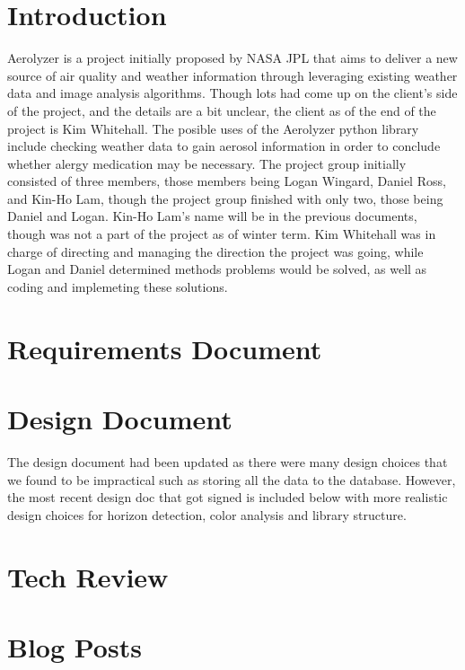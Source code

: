 \documentclass[onecolumn, draftclsnofoot,10pt, compsoc]{IEEEtran}
\begin{document}
\tableofcontents
\clearpage

\begin{singlespace}

	\section{Introduction}
		Aerolyzer is a project initially proposed by NASA JPL that aims to deliver a new source of air quality and weather information through leveraging existing weather data and image analysis algorithms.
		Though lots had come up on the client's side of the project, and the details are a bit unclear, the client as of the end of the project is Kim Whitehall.
		The posible uses of the Aerolyzer python library include checking weather data to gain aerosol information in order to conclude whether alergy medication may be necessary.
		The project group initially consisted of three members, those members being Logan Wingard, Daniel Ross, and Kin-Ho Lam, though the project group finished with only two, those being Daniel and Logan.
		Kin-Ho Lam's name will be in the previous documents, though was not a part of the project as of winter term.
		Kim Whitehall was in charge of directing and managing the direction the project was going, while Logan and Daniel determined methods problems would be solved, as well as coding and implemeting these solutions.
		
	\section{Requirements Document}
		
	\section{Design Document}
		The design document had been updated as there were many design choices that we found to be impractical such as storing all the data to the database. 
		However, the most recent design doc that got signed is included below with more realistic design choices for horizon detection, color analysis and library structure.
		
	\section{Tech Review}
		
	\section{Blog Posts}

\end{singlespace}
\end{document}
